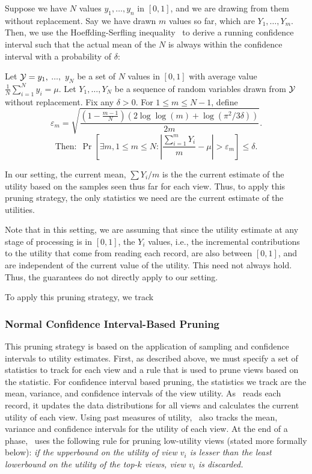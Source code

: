 Suppose we have $N$ values $y_1, \ldots, y_n$ in $[0, 1]$, and we are drawing
from them without replacement. 
Say we have drawn $m$ values so far, which are $Y_1, \ldots, Y_m$.
Then, we use the Hoeffding-Serfling inequality~\cite{serfling1974probability} 
to derive a running 
confidence interval such that the actual mean of the $N$
is always within the confidence interval with a probability of $\delta$:
\begin{theorem}
\label{thm:hs}
Let $\mathcal{Y} = y_1,$ $\ldots,$ $y_N$ be a set of $N$ 
values in $[0,1]$ with average value
$\frac1N \sum_{i=1}^N y_i = \mu$.
Let $Y_1,\ldots,Y_N$ be a 
sequence of random variables drawn from $\mathcal{Y}$ without
replacement.
Fix any $\delta > 0$. For $1 \le m \le N-1$, define
$$
\varepsilon_m = \sqrt{\frac{(1-\frac{m-1}N)(2\log \log (m) + \log(\pi^2/3\delta))}{2m}}.
$$
$$
\textrm{Then:} \ \   \Pr\left[ \exists m, 1 \le m \le N : 
  \left|\frac{\sum_{i=1}^m Y_i}{m} - \mu\right| > \varepsilon_m \right] 
\le \delta.
$$
\end{theorem}
In our setting, the current mean, $\sum Y_i / m$ is the 
the current estimate of the utility based on the samples seen thus far
for each view. 
Thus, to apply this pruning strategy, the only statistics
we need are the current estimate of the utilities.

Note that in this setting, we are assuming that since the
utility estimate at any stage of processing is in $[0, 1]$, 
the $Y_i$ values, i.e., the incremental contributions to the utility
that come from reading each record, are also between $[0, 1]$,
and are independent of the current value of the utility. 
This need not always hold. 
Thus, the guarantees do not directly apply to our setting. 


To apply this pruning strategy, we track 


\subsubsection{Normal Confidence Interval-Based Pruning}
\label{sec:confident_interval}
This pruning strategy is based on the application of sampling and confidence
intervals to utility estimates. First, as described above, we must specify
a set of statistics to track for each view and a rule that is used to
prune views based on the statistic.
For confidence interval based pruning, the statistics we track are the mean, 
variance, and confidence intervals of the view utility.
As \VizRecDB\ reads each record, it updates the data
distributions for all views and calculates the current utility of each view. 
Using past measures of utility, \VizRecDB\ also tracks the mean,
variance and confidence intervals for the utility of each view.
At the end of a phase, \VizRecDB\ uses the following rule for pruning low-utility
views (stated more formally below): {\it if the upperbound on the utility
of view $v_i$ is lesser than the least lowerbound on the utility of the
top-$k$ views, view $v_i$ is discarded.}

